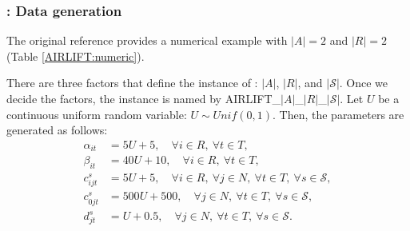 \subsubsection{\airlift: Data generation}
The original reference \cite{journal:MW1969} provides a numerical example with $|A|=2$ and $|R|=2$ (Table \ref{AIRLIFT:numeric}). 

\begin{table}[H]
	\caption{Numerical data in \cite{journal:MW1969}}
	\label{AIRLIFT:numeric}
	\centering
\end{table}

There are three factors that define the instance of \airlift: $|A|$, $|R|$, and $|\mathcal{S}|$. Once we decide the factors, the instance is named by AIRLIFT\_$|A|$\_$|R|$\_$|\mathcal{S}|$. Let $U$ be a continuous uniform random variable: $U\sim Unif(0,1)$. Then, the parameters are generated as follows:
\begin{align*}
\alpha_{it}&=5U+5,\quad\forall i\in R,\ \forall t\in T, \\
\beta_{it} &=40U+10,\quad\forall i\in R,\ \forall t\in T, \\
c_{ijt}^s  &=5U+5,\quad\forall i\in R,\ \forall j\in N,\ \forall t\in T,\ \forall s\in\mathcal{S}, \\
c_{0jt}^s  &=500U+500,\quad\forall j\in N,\ \forall t\in T,\ \forall s\in\mathcal{S}, \\
d_{jt}^s   &=U+0.5,\quad\forall j\in N,\ \forall t\in T,\ \forall s\in\mathcal{S}.
\end{align*}

